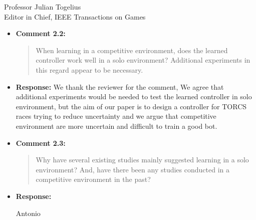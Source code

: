 \documentclass[10pt]{letter} %
\begin{document}
\begin{letter}{Professor Julian Togelius \\ Editor in Chief, IEEE Transactions on Games}
\begin{enumerate}
\begin{itemize}
\begin{itemize}
                        that is indeed a good suggestion for future
                        work, for which we are really grateful. For
                        the time being, that introduction of another
                        variable in the problem was not considered for
                        this paper.
		\item {\bf Comment 2.2:}
		\begin{quote}
When learning in a competitive environment, does the learned controller work well in a solo environment? Additional experiments in this regard appear to be necessary.
			\end{quote}	
		\item {\bf Response:} 
		We thank the reviewer for the comment, We agree that additional experiments would be needed to test the learned controller in solo environment, but the aim of our paper is to design a controller for TORCS races trying to reduce uncertainty and we argue that competitive environment are more uncertain and difficult to train a good bot.
		
		\item {\bf Comment 2.3:}
		\begin{quote}
Why have several existing studies mainly suggested learning in a solo environment? And, have there been any studies conducted in a competitive environment in the past?
			\end{quote}	
		\item {\bf Response:} 
		
		Antonio
		

\end{itemize}
\end{itemize}
\end{enumerate}
\end{letter}
\end{document}
